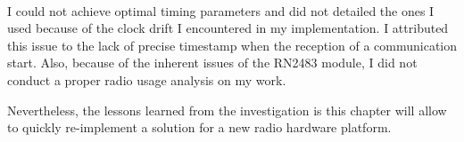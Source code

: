 \paragraph{}

I could not achieve optimal timing parameters and did not detailed the ones
I used because of the clock drift I encountered in my implementation.
I attributed this issue to the lack of precise timestamp when the reception of a communication start.
Also, because of the inherent issues of the RN2483 module,
I did not conduct a proper radio usage analysis on my work.

Nevertheless, the lessons learned from the investigation is this chapter will
allow to quickly re-implement a solution for a new radio hardware platform.
